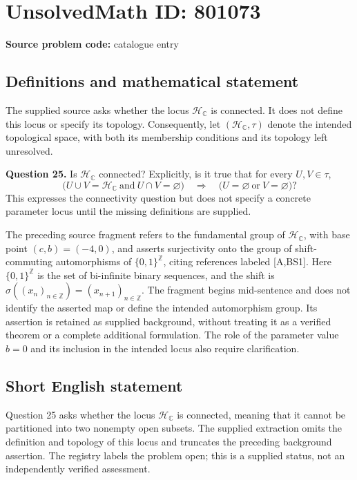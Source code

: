 \documentclass[11pt]{article}
\begin{document}
\section*{UnsolvedMath ID: 801073}
\textbf{Source problem code:} catalogue entry
\subsection{Definitions and mathematical statement}
The supplied source asks whether the locus $\mathcal{H}_{\mathbb{C}}$ is connected. It does not define this locus or specify its topology. Consequently, let $(\mathcal{H}_{\mathbb{C}},\tau)$ denote the intended topological space, with both its membership conditions and its topology left unresolved.

\textbf{Question 25.} Is $\mathcal{H}_{\mathbb{C}}$ connected? Explicitly, is it true that for every $U,V\in\tau$,
\[
\bigl(U\cup V=\mathcal{H}_{\mathbb{C}}\ \text{and}\ U\cap V=\varnothing\bigr)
\quad\Longrightarrow\quad
\bigl(U=\varnothing\ \text{or}\ V=\varnothing\bigr)?
\]
This expresses the connectivity question but does not specify a concrete parameter locus until the missing definitions are supplied.

The preceding source fragment refers to the fundamental group of $\mathcal{H}_{\mathbb{C}}$, with base point $(c,b)=(-4,0)$, and asserts surjectivity onto the group of shift-commuting automorphisms of $\{0,1\}^{\mathbb{Z}}$, citing references labeled [A,BS1]. Here $\{0,1\}^{\mathbb{Z}}$ is the set of bi-infinite binary sequences, and the shift is $\sigma((x_n)_{n\in\mathbb{Z}})=(x_{n+1})_{n\in\mathbb{Z}}$. The fragment begins mid-sentence and does not identify the asserted map or define the intended automorphism group. Its assertion is retained as supplied background, without treating it as a verified theorem or a complete additional formulation. The role of the parameter value $b=0$ and its inclusion in the intended locus also require clarification.
\subsection{Short English statement}
Question 25 asks whether the locus $\mathcal{H}_{\mathbb{C}}$ is connected, meaning that it cannot be partitioned into two nonempty open subsets. The supplied extraction omits the definition and topology of this locus and truncates the preceding background assertion. The registry labels the problem open; this is a supplied status, not an independently verified assessment.
\end{document}
